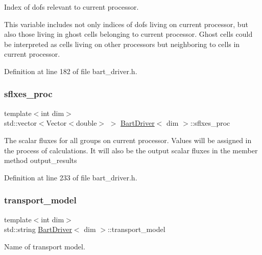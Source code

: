 Index of dofs relevant to current processor. 

This variable includes not only indices of dofs living on current processor, but also those living in ghost cells belonging to current processor. Ghost cells could be interpreted as cells living on other processors but neighboring to cells in current processor. 

Definition at line 182 of file bart\+\_\+driver.\+h.

\mbox{\label{class_bart_driver_a560ae94f3801fb64a35fdbcd0d8a772d}} 
\subsubsection{\texorpdfstring{sflxes\+\_\+proc}{sflxes\_proc}}
{\footnotesize\ttfamily template$<$int dim$>$ \\
std\+::vector$<$Vector$<$double$>$ $>$ \hyperlink{class_bart_driver}{Bart\+Driver}$<$ dim $>$\+::sflxes\+\_\+proc\hspace{0.3cm}{\ttfamily [private]}}

The scalar fluxes for all groups on current processor. Values will be assigned in the process of calculations. It will also be the output scalar fluxes in the member method output\+\_\+results 

Definition at line 233 of file bart\+\_\+driver.\+h.

\mbox{\label{class_bart_driver_a736f40f99459dc715fdb174e06626f55}} 
\subsubsection{\texorpdfstring{transport\+\_\+model}{transport\_model}}
{\footnotesize\ttfamily template$<$int dim$>$ \\
std\+::string \hyperlink{class_bart_driver}{Bart\+Driver}$<$ dim $>$\+::transport\+\_\+model\hspace{0.3cm}{\ttfamily [private]}}



Name of transport model. 



